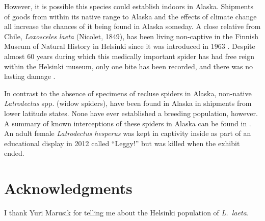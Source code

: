 However, it is possible this species could establish indoors in Alaska. Shipments of goods from within its native range to Alaska and the effects of climate change all increase the chances of it being found in Alaska someday. A close relative from Chile, \textit{Loxosceles laeta} (Nicolet, 1849), has been living non-captive in the Finnish Museum of Natural History in Helsinki since it was introduced in 1963 \citep{Huhta1972, Nicholls2016}. Despite almost 60 years during which this medically important spider has had free reign within the Helsinki museum, only one bite has been recorded, and there was no lasting damage \citep{Nicholls2016}.

In contrast to the absence of specimens of recluse spiders in Alaska, non-native \textit{Latrodectus} spp. (widow spiders), have been found in Alaska in shipments from lower latitude states. None have ever established a breeding population, however. A summary of known interceptions of these spiders in Alaska can be found in \citet{Bowser2013}. An adult female \textit{Latrodectus hesperus} was kept in captivity inside  as part of an educational display in 2012 called ``Leggy!'' \citep{Sikes2012} but was killed when the exhibit ended.

\section{Acknowledgments}
I thank Yuri Marusik for telling me about the Helsinki population of \textit{L.\ laeta.}

%

